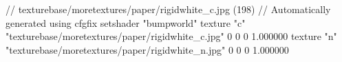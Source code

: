 // texturebase/moretextures/paper/rigidwhite_c.jpg (198)
// Automatically generated using cfgfix
setshader "bumpworld"
texture "c" "texturebase/moretextures/paper/rigidwhite_c.jpg" 0 0 0 1.000000
texture "n" "texturebase/moretextures/paper/rigidwhite_n.jpg" 0 0 0 1.000000
